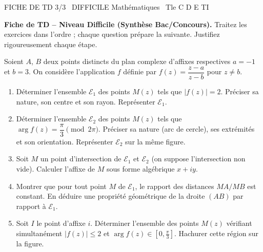 \documentclass[11pt]{article}
\begin{document}
\begin{tcolorbox}[enhanced,colback=popink,colframe=popink,arc=10pt,boxrule=0pt,left=12pt,right=12pt,top=9pt,bottom=9pt]
{\color{white}\popxbold\small FICHE DE TD 3/3 \textbullet\ DIFFICILE \hfill Mathématiques \textbullet\ Tle C D E TI\par}
\end{tcolorbox}
\vspace{4pt}
\noindent \textbf{Fiche de TD -- Niveau Difficile (Synthèse Bac/Concours).} Traitez les exercices dans l'ordre ; chaque question prépare la suivante. Justifiez rigoureusement chaque étape.

\begin{exercice}
Soient $A$, $B$ deux points distincts du plan complexe d'affixes respectives $a = -1$ et $b = 3$. On considère l'application $f$ définie par $f(z) = \dfrac{z-a}{z-b}$ pour $z \neq b$.
\begin{enumerate}
    \item Déterminer l'ensemble $\mathcal{E}_1$ des points $M(z)$ tels que $|f(z)| = 2$. Préciser sa nature, son centre et son rayon. Représenter $\mathcal{E}_1$.
    \item Déterminer l'ensemble $\mathcal{E}_2$ des points $M(z)$ tels que $\arg f(z) = \dfrac{\pi}{3} \pmod{2\pi}$. Préciser sa nature (arc de cercle), ses extrémités et son orientation. Représenter $\mathcal{E}_2$ sur la même figure.
    \item Soit $M$ un point d'intersection de $\mathcal{E}_1$ et $\mathcal{E}_2$ (on suppose l'intersection non vide). Calculer l'affixe de $M$ sous forme algébrique $x+iy$.
    \item Montrer que pour tout point $M$ de $\mathcal{E}_1$, le rapport des distances $MA/MB$ est constant. En déduire une propriété géométrique de la droite $(AB)$ par rapport à $\mathcal{E}_1$.
    \item Soit $I$ le point d'affixe $i$. Déterminer l'ensemble des points $M(z)$ vérifiant simultanément $|f(z)| \leq 2$ et $\arg f(z) \in \left[0, \frac{\pi}{3}\right]$. Hachurer cette région sur la figure.
\end{enumerate}
\end{exercice}
\end{document}
